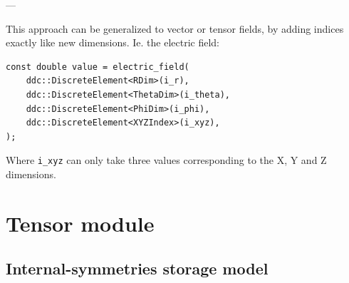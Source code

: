 \documentclass[9pt, svgnames, aspectratio=32, handout]{beamer}
\newenvironment{tframe}[1][]{%
  \begin{frame}[fragile,environment=tframe]{%
    \normalsize{{\bfseries \secname} --- \small{\subsecname} #1}%
  }%
}{%
  \end{frame}%
}
\begin{document}
\begin{tframe}
This approach can be generalized to vector or tensor fields, by adding indices exactly like new dimensions. Ie. the electric field:

\begin{lstlisting}
const double value = electric_field(
	ddc::DiscreteElement<RDim>(i_r), 
	ddc::DiscreteElement<ThetaDim>(i_theta), 
	ddc::DiscreteElement<PhiDim>(i_phi), 
	ddc::DiscreteElement<XYZIndex>(i_xyz), 
);
\end{lstlisting}

Where \texttt{i\_xyz} can only take three values corresponding to the X, Y and Z dimensions.
\end{tframe}

\section{Tensor module}

\subsection{Internal-symmetries storage model}
\end{document}
